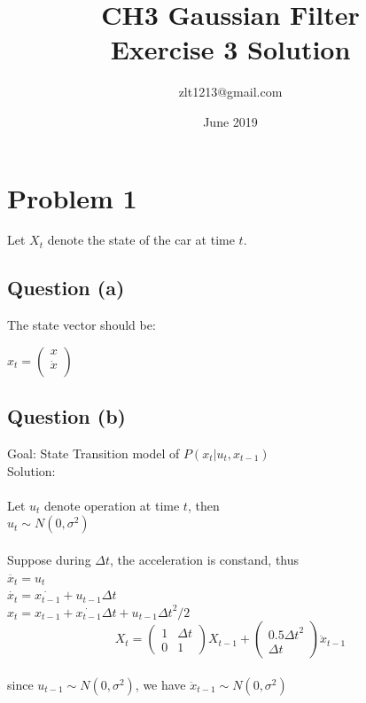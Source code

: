 \documentclass{article}
\title{ CH3 Gaussian Filter \\  Exercise 3 Solution}
\author{zlt1213@gmail.com}
\date{June 2019}
\begin{document}
\maketitle

\section{Problem 1}
Let $X_t$ denote the state of the car at time $t$. 
\subsection{Question (a)}
The state vector should be:

$
x_t = 
\begin{pmatrix}
x \\
\dot{x}\\
\end{pmatrix}
$



\subsection{Question (b)}
Goal: State Transition model of $P(x_t | u_t, x_{t-1})$ \\
Solution:\\ \\
Let $u_t$ denote operation at time $t$, then \\
$u_t\sim{N(0, \sigma^2)}$ \\ \\
Suppose during $\Delta t$, the acceleration is constand, thus\\
$\ddot{x_t}=u_t$\\
$\dot{x_t} = \dot{x_{t-1}}+u_{t-1} \Delta t$ \\
$x_t = x_{t-1}+ \dot{x_{t-1}}\Delta t + u_{t-1}{\Delta t}^2/2$\\

$$
X_t = 
\begin{pmatrix}
1 & \Delta t \\
0 & 1 
\end{pmatrix} X_{t-1} + 
\begin{pmatrix}
0.5{\Delta t}^2  \\
\Delta t
\end{pmatrix} \ddot{x}_{t-1}
$$\\
since $u_{t-1}\sim{N(0, \sigma^2)}$, we have $\ddot{x}_{t-1}\sim{N(0, \sigma^2)}$\\
\end{document}
